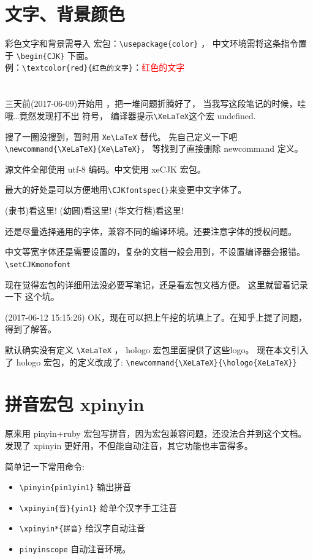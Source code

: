 \documentclass[a4paper,11pt]{article}
\begin{document}
\section{文字、背景颜色}
彩色文字和背景需导入  宏包：\verb+\usepackage{color}+ ，
中文环境需将这条指令置于 \verb+\begin{CJK}+ 下面。\\
例：\verb+\textcolor{red}{红色的文字}+：\textcolor{red}{红色的文字}

\section{\XeLaTeX}
三天前(2017-06-09)开始用 \XeLaTeX ，把一堆问题折腾好了，
当我写这段笔记的时候，哇哦\ldots 竟然发现打不出 \XeLaTeX 符号，
编译器提示\verb+\XeLaTeX+这个宏 undefined.

搜了一圈没搜到，暂时用 \verb+Xe\LaTeX+ 替代。
先自己定义一下吧 \verb+\newcommand{\XeLaTeX}{Xe\LaTeX}+，
等找到了直接删除 newcommand 定义。

源文件全部使用 utf-8 编码。中文使用 xeCJK 宏包。

\XeLaTeX 最大的好处是可以方便地用\verb+\CJKfontspec{}+来变更中文字体了。

{(隶书)看这里!}
{(幼圆)看这里!}
{(华文行楷)看这里!}

还是尽量选择通用的字体，兼容不同的编译环境。还要注意字体的授权问题。

中文等宽字体还是需要设置的，复杂的文档一般会用到，不设置编译器会报错。
\verb+\setCJKmonofont+

现在觉得宏包的详细用法没必要写笔记，还是看宏包文档方便。
这里就留着记录一下 \XeLaTeX 这个坑。

(2017-06-12 15:15:26)
OK，现在可以把上午挖的坑填上了。在知乎上提了问题，得到了解答。

默认确实没有定义 \verb+\XeLaTeX+ ， hologo 宏包里面提供了这些logo。
现在本文引入了 hologo 宏包，\XeLaTeX 的定义改成了:
\verb+\newcommand{\XeLaTeX}{\hologo{XeLaTeX}}+

\section{拼音宏包 xpinyin}
原来用 pinyin+ruby 宏包写拼音，因为宏包兼容问题，还没法合并到这个文档。
发现了 xpinyin 更好用，不但能自动注音，其它功能也丰富得多。

简单记一下常用命令:
\begin{itemize}
	\item \verb+\pinyin{pin1yin1}+ 输出拼音
	\item \verb+\xpinyin{音}{yin1}+ 给单个汉字手工注音
	\item \verb+\xpinyin*{拼音}+ 给汉字自动注音
	\item \verb+pinyinscope+ 自动注音环境。
\end{itemize}
\end{document}
